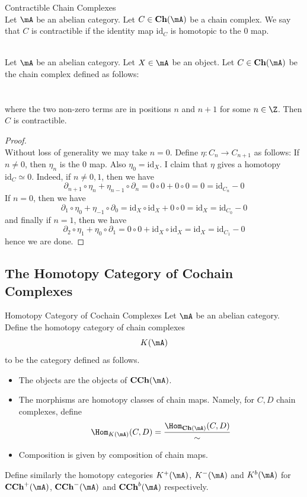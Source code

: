 \documentclass[a4paper]{article}
\begin{document}
\begin{defn}{Contractible Chain Complexes}{}\\
Let $\mA$ be an abelian category. Let $C\in\bold{Ch}(\mA)$ be a chain complex. We say that $C$ is contractible if the identity map $\text{id}_C$ is homotopic to the $0$ map. 
\end{defn}

\begin{eg}{}{}\\
Let $\mA$ be an abelian category. Let $X\in\mA$ be an object. Let $C\in\bold{Ch}(\mA)$ be the chain complex defined as follows: \\
\\~\\
where the two non-zero terms are in positions $n$ and $n+1$ for some $n\in\Z$. Then $C$ is contractible. 
\begin{proof}\\
Without loss of generality we may take $n=0$. Define $\eta:C_n\to C_{n+1}$ as follows: If $n\neq 0$, then $\eta_n$ is the $0$ map. Also $\eta_0=\text{id}_X$. I claim that $\eta$ gives a homotopy $\text{id}_C\simeq 0$. Indeed, if $n\neq 0,1$, then we have $$\partial_{n+1}\circ\eta_n+\eta_{n-1}\circ\partial_n=0\circ 0+0\circ 0=0=\text{id}_{C_n}-0$$ If $n=0$, then we have $$\partial_1\circ\eta_0+\eta_{-1}\circ\partial_0=\text{id}_X\circ\text{id}_X+0\circ 0=\text{id}_X=\text{id}_{C_0}-0$$ and finally if $n=1$, then we have $$\partial_2\circ\eta_1+\eta_0\circ\partial_1=0\circ 0+\text{id}_X\circ\text{id}_X=\text{id}_X=\text{id}_{C_1}-0$$ hence we are done. 
\end{proof}
\end{eg}

\subsection{The Homotopy Category of Cochain Complexes}
\begin{defn}{Homotopy Category of Cochain Complexes}{} Let $\mA$ be an abelian category. Define the homotopy category of chain complexes $$K(\mA)$$ to be the category defined as follows. 
\begin{itemize}
\item The objects are the objects of $\bold{CCh}(\mA)$. 
\item The morphisms are homotopy classes of chain maps. Namely, for $C,D$ chain complexes, define $$\Hom_{K(\mA)}(C,D)=\frac{\Hom_{\bold{Ch}(\mA)}(C,D)}{\sim}$$
\item Composition is given by composition of chain maps. 
\end{itemize}
Define similarly the homotopy categories $K^+(\mA)$, $K^-(\mA)$ and $K^b(\mA)$ for $\bold{CCh}^+(\mA)$, $\bold{CCh}^-(\mA)$ and $\bold{CCh}^b(\mA)$ respectively. 
\end{defn}
\end{document}
